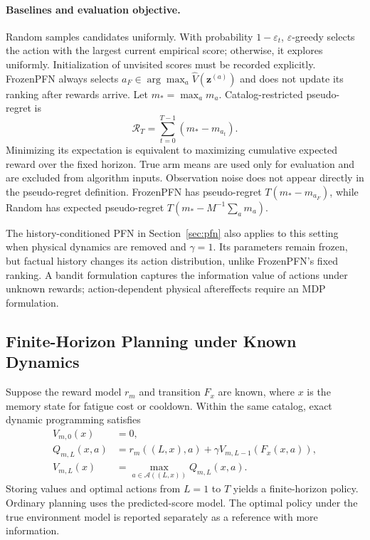 \documentclass[a4paper,11pt]{article}
\numberwithin{equation}{section}
\begin{document}
\paragraph{Baselines and evaluation objective.}
Random samples candidates uniformly. With probability $1-\varepsilon_t$, $\varepsilon$-greedy selects the action with the largest current empirical score; otherwise, it explores uniformly. Initialization of unvisited scores must be recorded explicitly. FrozenPFN always selects $a_F\in\arg\max_a\widehat V(\mathbf z^{(a)})$ and does not update its ranking after rewards arrive. Let $m_*=\max_a m_a$. Catalog-restricted pseudo-regret is
\begin{equation}
\mathcal R_T=\sum_{t=0}^{T-1}(m_*-m_{a_t}).
\label{eq:regret}
\end{equation}
Minimizing its expectation is equivalent to maximizing cumulative expected reward over the fixed horizon. True arm means are used only for evaluation and are excluded from algorithm inputs. Observation noise does not appear directly in the pseudo-regret definition. FrozenPFN has pseudo-regret $T(m_*-m_{a_F})$, while Random has expected pseudo-regret $T(m_*-M^{-1}\sum_a m_a)$.

The history-conditioned PFN in Section~\ref{sec:pfn} also applies to this setting when physical dynamics are removed and $\gamma=1$. Its parameters remain frozen, but factual history changes its action distribution, unlike FrozenPFN's fixed ranking. A bandit formulation captures the information value of actions under unknown rewards; action-dependent physical aftereffects require an MDP formulation.

\subsection{Finite-Horizon Planning under Known Dynamics}
\label{sec:planning}
Suppose the reward model $r_m$ and transition $F_x$ are known, where $x$ is the memory state for fatigue cost or cooldown. Within the same catalog, exact dynamic programming satisfies
\begin{align}
V_{m,0}(x)&=0,\\
Q_{m,L}(x,a)&=r_m((L,x),a)+\gamma V_{m,L-1}(F_x(x,a)),\\
V_{m,L}(x)&=\max_{a\in\mathcal A((L,x))}Q_{m,L}(x,a).
\label{eq:bellman}
\end{align}
Storing values and optimal actions from $L=1$ to $T$ yields a finite-horizon policy. Ordinary planning uses the predicted-score model. The optimal policy under the true environment model is reported separately as a reference with more information.
\end{document}
